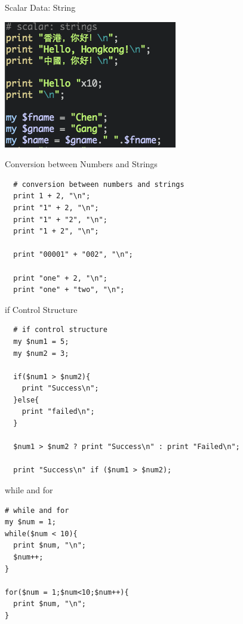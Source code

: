 \documentclass[UTF8]{beamer}
\begin{document}
\begin{frame}[t]{Scalar Data: String}
  \centerline{\includegraphics[height=.6\textheight]{string.png}}
\end{frame}

\begin{frame}[fragile]{Conversion between Numbers and Strings}
\begin{verbatim}
  # conversion between numbers and strings
  print 1 + 2, "\n";
  print "1" + 2, "\n";
  print "1" + "2", "\n";
  print "1 + 2", "\n";

  print "00001" + "002", "\n";

  print "one" + 2, "\n";
  print "one" + "two", "\n";
\end{verbatim}
\end{frame}

\begin{frame}[fragile]{if Control Structure}
\begin{verbatim}
  # if control structure
  my $num1 = 5;
  my $num2 = 3;

  if($num1 > $num2){
    print "Success\n";
  }else{
    print "failed\n";
  }

  $num1 > $num2 ? print "Success\n" : print "Failed\n";

  print "Success\n" if ($num1 > $num2);
\end{verbatim}
\end{frame}

\begin{frame}[fragile]{while and for}
\begin{verbatim}
# while and for
my $num = 1;
while($num < 10){
  print $num, "\n";
  $num++;
}

for($num = 1;$num<10;$num++){
  print $num, "\n";
}
\end{verbatim}
\end{frame}
\end{document}
